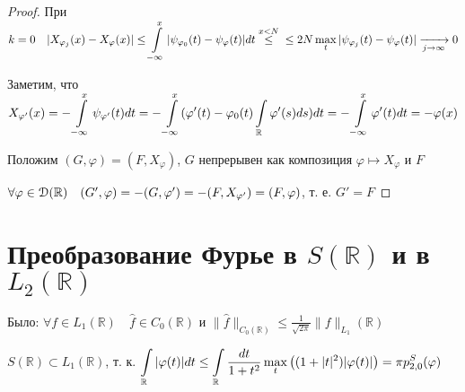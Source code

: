 \documentclass[a4paper,12pt]{report}
\newcommand*{\hm}[1]{#1\nobreak\discretionary{}%
            {\hbox{$\mathsurround=0pt #1$}}{}}
\begin{document}
\begin{proof}
При $k=0\quad |X_{\varphi_j}(x)-X_\varphi(x)|\le\displaystyle\int\limits_{-\infty}^x|\psi_{\varphi_0}(t)-\psi_\varphi(t)|dt\stackrel{x<N}{\le}\\
\le2N\max\limits_t|\psi_{\varphi_j}(t)-\psi_\varphi(t)|\xrightarrow[j\to\infty]{}0$

Заметим, что $X_{\varphi'}(x)=-\displaystyle\int\limits_{-\infty}^x\psi_{\varphi'}(t)dt=-\displaystyle\int\limits_{-\infty}^x(\varphi'(t)-\varphi_0(t)\displaystyle\int\limits_{\mathbb R}\varphi'(s)ds)dt\hm=-\displaystyle\int\limits_{-\infty}^x\varphi'(t)dt=-\varphi(x)$

Положим $(G,\varphi)=(F,X_\varphi)$, $G$ непрерывен как композиция $\varphi\mapsto X_\varphi$ и $F$

 $\forall\varphi\in\EuScript D(\mathbb R)\quad(G',\varphi)=-(G,\varphi')=-(F,X_{\varphi'})=(F,\varphi)$, т. е. $G'=F$
\end{proof}







\chapter{Преобразование Фурье в $S(\mathbb R)$ и в $L_2(\mathbb R)$}

Было: $\forall f\in L_1(\mathbb R)\quad\hat f\in C_0(\mathbb R)$ и $\|\hat f\|_{C_0(\mathbb R)}\le\frac1{\sqrt{2\pi}}\|f\|_{L_1}(\mathbb R)$

\begin{rem}
$S(\mathbb R)\subset L_1(\mathbb R)$, т. к. $\displaystyle\int\limits_{\mathbb R}|\varphi(t)|dt\le\displaystyle\int\limits_{\mathbb R}\frac{dt}{1+t^2}\max\limits_t\left( (1+|t|^2)|\varphi(t)|\right)\hm=\pi p_{2,0}^S(\varphi)$
\end{rem}
\end{document}
